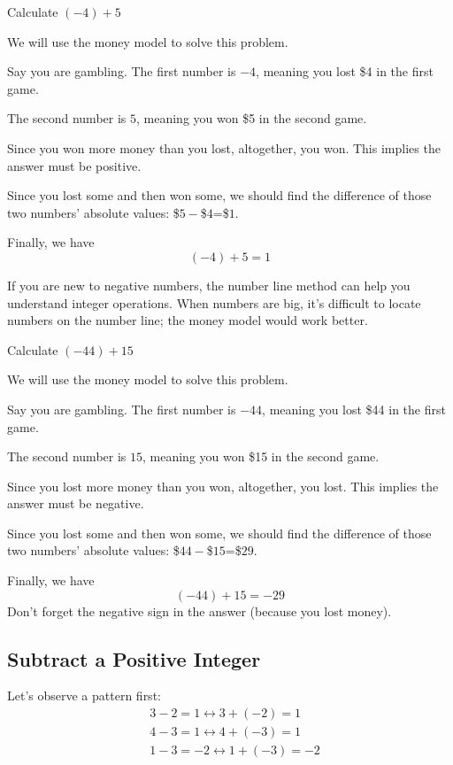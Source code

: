 \begin{myexample}
Calculate $(-4)+5$
\label{ex:e-4+5}
\end{myexample}
\begin{solution}
We will use the money model to solve this problem.
	\begin{steps}
	\item Say you are gambling. The first number is $-4$, meaning you lost \$4 in the first game. 
	\item The second number is $5$, meaning you won \$5 in the second game. 
	\item Since you won more money than you lost, altogether, you won. This implies the answer must be positive.
	\item Since you lost some and then won some, we should find the difference of those two numbers' absolute values: \$$5-$\$$4$=\$$1$.
	\end{steps}
	Finally, we have \[(-4)+5=1\]
\end{solution}

If you are new to negative numbers, the number line method can help you understand integer operations. When numbers are big, it's difficult to locate numbers on the number line; the money model would work better.

\begin{myexample}
Calculate $(-44)+15$
\end{myexample}
\begin{solution}
We will use the money model to solve this problem.
	\begin{steps}
	\item Say you are gambling. The first number is $-44$, meaning you lost \$44 in the first game. 
	\item The second number is $15$, meaning you won \$15 in the second game. 
	\item Since you lost more money than you won, altogether, you lost. This implies the answer must be negative.
	\item Since you lost some and then won some, we should find the difference of those two numbers' absolute values: \$$44-$\$$15$=\$$29$.
	\end{steps}
	Finally, we have \[(-44)+15=-29\]
	Don't forget the negative sign in the answer (because you lost money).
\end{solution}

\subsection{Subtract a Positive Integer}
Let's observe a pattern first:
\begin{align*}
	&3-2 = 1 \longleftrightarrow 3+(-2) =1 \\
	&4-3 =1  \longleftrightarrow 4+(-3) =1 \\
	&1-3 =-2  \longleftrightarrow 1+(-3) =-2 
\end{align*}

